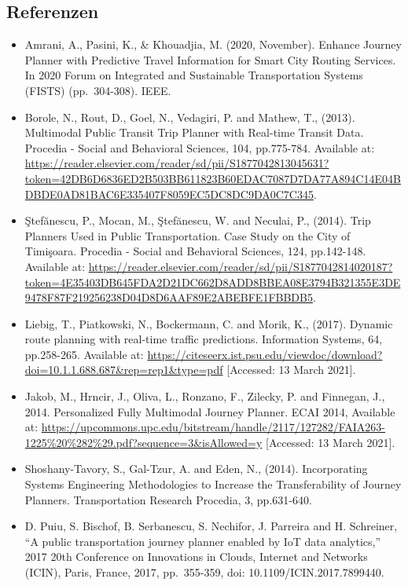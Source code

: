 \documentclass[
]{book}
\providecommand{\tightlist}{%
  \setlength{\itemsep}{0pt}\setlength{\parskip}{0pt}}
\begin{document}
\hypertarget{referenzen-20}{%
\subsection*{Referenzen}\label{referenzen-20}}

\begin{itemize}
\tightlist
\item
  Amrani, A., Pasini, K., \& Khouadjia, M. (2020, November). Enhance Journey Planner with Predictive Travel Information for Smart City Routing Services. In 2020 Forum on Integrated and Sustainable Transportation Systems (FISTS) (pp.~304-308). IEEE.
\item
  Borole, N., Rout, D., Goel, N., Vedagiri, P. and Mathew, T., (2013). Multimodal Public Transit Trip Planner with Real-time Transit Data. Procedia - Social and Behavioral Sciences, 104, pp.775-784. Available at: \url{https://reader.elsevier.com/reader/sd/pii/S1877042813045631?token=42DB6D6836ED2B503BB611823B60EDAC7087D7DA77A894C14E04BDBDE0AD81BAC6E335407F8059EC5DC8DC9DA0C7C345}.
\item
  Ştefănescu, P., Mocan, M., Ştefănescu, W. and Neculai, P., (2014). Trip Planners Used in Public Transportation. Case Study on the City of Timişoara. Procedia - Social and Behavioral Sciences, 124, pp.142-148. Available at: \url{https://reader.elsevier.com/reader/sd/pii/S1877042814020187?token=4E35403DB645FDA2D21DC662D8ADD8BBEA08E3794B321355E3DE9478F87F219256238D04D8D6AAF89E2ABEBFE1FBBDB5}.
\item
  Liebig, T., Piatkowski, N., Bockermann, C. and Morik, K., (2017). Dynamic route planning with real-time traffic predictions. Information Systems, 64, pp.258-265. Available at: \url{https://citeseerx.ist.psu.edu/viewdoc/download?doi=10.1.1.688.687\&rep=rep1\&type=pdf} {[}Accessed: 13 March 2021{]}.
\item
  Jakob, M., Hrncir, J., Oliva, L., Ronzano, F., Zilecky, P. and Finnegan, J., 2014. Personalized Fully Multimodal Journey Planner. ECAI 2014, Available at: \url{https://upcommons.upc.edu/bitstream/handle/2117/127282/FAIA263-1225\%20\%282\%29.pdf?sequence=3\&isAllowed=y} {[}Accessed: 13 March 2021{]}.
\item
  Shoshany-Tavory, S., Gal-Tzur, A. and Eden, N., (2014). Incorporating Systems Engineering Methodologies to Increase the Transferability of Journey Planners. Transportation Research Procedia, 3, pp.631-640.
\item
  D. Puiu, S. Bischof, B. Serbanescu, S. Nechifor, J. Parreira and H. Schreiner, ``A public transportation journey planner enabled by IoT data analytics,'' 2017 20th Conference on Innovations in Clouds, Internet and Networks (ICIN), Paris, France, 2017, pp.~355-359, doi: 10.1109/ICIN.2017.7899440.
\end{itemize}
\end{document}
